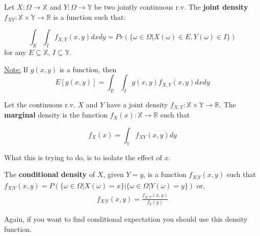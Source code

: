 \documentclass[aspectratio=169]{beamer}
\begin{document}
\begin{frame}
\begin{definition}
    Let $X:\Omega\rightarrow\mathbb{X}$ and $Y:\Omega\rightarrow\mathbb{Y}$ be two jointly continuous r.v. The \textbf{joint density} $f_{XY}:\mathbb{X}\times\mathbb{Y}\rightarrow\mathbb{R}$ is a function such that:

    $$\int_E\int_I f_{X,Y}(x,y)dxdy=Pr(\{\omega\in\Omega|X(\omega)\in E,Y(\omega)\in I\}) $$ for any $E\subseteq\mathbb{X}$, $I\subseteq\mathbb{Y}$.

\end{definition}

\underline{Note:} If $g(x,y)$ is a function, then $$E[g(x,y)]=\int_E\int_I g(x,y)f_{X,Y}(x,y)dxdy$$
\end{frame}

\begin{frame}
    \begin{definition}
        Let the continuous r.v. $X$ and $Y$ have a joint density $f_{X,Y}:\mathbb{X}\times\mathbb{Y}\rightarrow\mathbb{R}$. The \textbf{marginal} density is the function $f_X(x):\mathbb{X}\rightarrow\mathbb{R}$ such that
        
        $$f_X(x)=\int_{\mathbb{Y}}f_{XY}(x,y)dy$$
        
    \end{definition}
    
    \vspace{0.2cm}
    
    What this is trying to do, is to isolate the effect of $x$.
\end{frame}

\begin{frame}
    \begin{definition}
        The \textbf{conditional density} of $X$, given $Y=y$, is a function $f_{X|Y}(x,y)$ such that
        \vspace{0.2cm}
 $f_{X|Y}(x,y)=P(\{\omega\in\Omega|X(\omega)=x\}|\{\omega\in\Omega|Y(\omega)=y\})$
        or,
        \begin{align*}
            f_{X|Y}(x,y)=\frac{f_{X,Y}(x,y)}{f_Y(y)}
        \end{align*}
    \end{definition}
    Again, if you want to find conditional expectation you should use this density function.
\end{frame}
\end{document}
